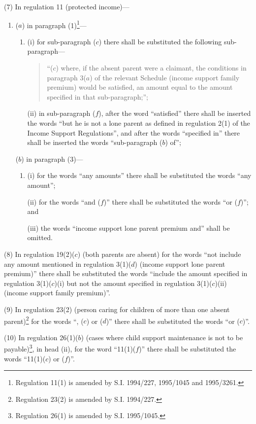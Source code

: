 \documentclass[a4paper]{article}
\begin{document}
(7) In regulation 11 (protected income)---
\begin{enumerate}\item[]
($a$) in paragraph (1)\footnote{\frenchspacing Regulation 11(1) is amended by S.I. 1994/227, 1995/1045 and 1995/3261.}—
\begin{enumerate}\item[]
(i) for sub-paragraph ($c$) there shall be substituted the following sub-paragraph—
\begin{quotation}
“($c$) where, if the absent parent were a claimant, the conditions in paragraph 3($a$) of the relevant Schedule (income support family premium) would be satisfied, an amount equal to the amount specified in that sub-paragraph;”;
\end{quotation}

(ii) in sub-paragraph ($f$), after the word “satisfied” there shall be inserted the words “but he is not a lone parent as defined in regulation 2(1) of the Income Support Regulations”, and after the words “specified in” there shall be inserted the words “sub-paragraph ($b$) of”;
\end{enumerate}

($b$) in paragraph (3)—
\begin{enumerate}\item[]
(i) for the words “any amounts” there shall be substituted the words “any amount”;

(ii) for the words “and ($f$)” there shall be substituted the words “or ($f$)”; and

(iii) the words “income support lone parent premium and” shall be omitted.
\end{enumerate}
\end{enumerate}

(8) In regulation 19(2)($c$) (both parents are absent) for the words “not include any amount mentioned in regulation 3(1)($d$) (income support lone parent premium)” there shall be substituted the words “include the amount specified in regulation 3(1)($c$)(i) but not the amount specified in regulation 3(1)($c$)(ii) (income support family premium)”.

(9) In regulation 23(2) (person caring for children of more than one absent parent)\footnote{\frenchspacing Regulation 23(2) is amended by S.I. 1994/227.}  for the words “, ($c$) or ($d$)” there shall be substituted the words “or ($c$)”.

(10)  In regulation 26(1)($b$) (cases where child support maintenance is not to be payable)\footnote{\frenchspacing Regulation 26(1) is amended by S.I. 1995/1045.}, in head (ii), for the word “11(1)($f$)” there shall be substituted the words “11(1)($c$) or ($f$)”.
\end{document}
